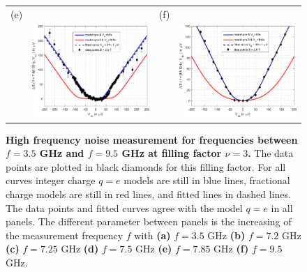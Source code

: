 \begin{figure}[hptb]
\begin{center}
\begin{tabular}{c c c c}
			(e) & & (f) & \\
			& \includegraphics[width = 6.5 cm]{./chap2/nu_3_RF_noise_vs_Vdc_at_7_85GHz} &
			& \includegraphics[width = 6.5 cm]{./chap2/nu_3_RF_noise_vs_Vdc_at_9_5GHz}
		\end{tabular}
	\end{center}
	
	\caption{\textbf{High frequency noise measurement for frequencies between $f = 3.5$ GHz and $f = 9.5$ GHz at filling factor $\nu = 3$.} The data points are plotted in black diamonds for this filling factor. For all curves integer charge $q = e$ models are still in blue lines, fractional charge models are still in red lines, and fitted lines in dashed lines. The data points and fitted curves agree with the model $q=e$ in all panels. The different parameter between panels is the increasing of the measurement frequency $f$ with \textbf{(a)} $f = 3.5$ GHz \textbf{(b)} $f = 7.2$ GHz \textbf{(c)} $f = 7.25$ GHz \textbf{(d)} $f = 7.5$ GHz \textbf{(e)} $f = 7.85$ GHz \textbf{(f)} $f = 9.5$ GHz.}
	\label{fig: RF charac at 3}
\end{figure}

